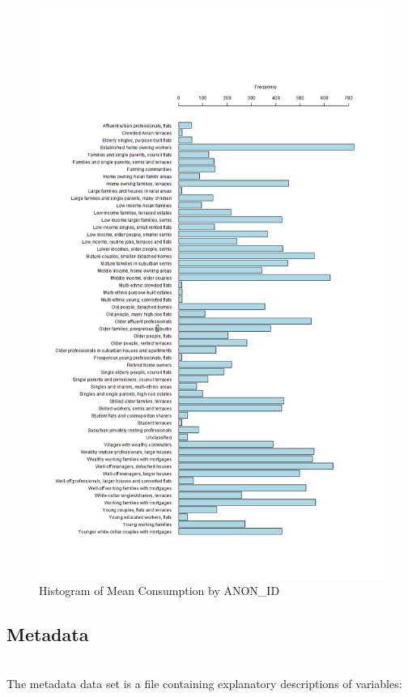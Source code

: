         \begin{figure}[H]
        \centering     
        \includegraphics[width=1\textwidth]{Figures/EDA_images/acorn_description.png}
        \caption{Histogram of Mean Consumption by ANON\_ID}
        \label{fig:Daily Consumption}
        \end{figure}
        
        \subsection{Metadata} \\
        The metadata data set is a file containing explanatory descriptions of variables:
        
